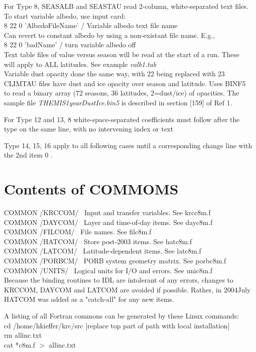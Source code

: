 \documentclass{article}
\newcommand{\qi}{\\ \hspace*{2.em}}      %
\newcommand{\nf}{\textit}  %
\begin{document}
For Type 8, SEASALB and SEASTAU read 2-column, white-separated text files. \\
To start variable albedo, use input card: 
\qi  8 22 0 'AlbedoFileName' / Variable albedo text file name \\
Can revert to constant albedo by using a non-existant file name. E.g.,
\qi  8 22 0 'badName' / turn variable albedo off \\
Text table files of value versus season will be read at the start of a
run. These will apply to ALL latitudes. See example  \nf{valb1.tab}   \\
Variable dust opacity done the same way, with 22 being replaced with 23 \\

CLIMTAU files have dust and ice opacity over season and latitude. Uses BINF5 to
read a binary array (72 seasons, 36 latitudes, 2=dust/ice) of opacities. The
sample file \nf{THEMIS1yearDustIce.bin5} is described in section [159] of Ref 1.

For Type 12 and 13, 8 white-space-separated coefficients must follow after 
the type on the same line, with no intervening index or text 

Type 14, 15, 16 apply to all following cases until a corresponding change line
with the 2nd item 0 .
 
\section{Contents of COMMOMS } %
 COMMON /KRCCOM/ \ Input and transfer variables. See krcc8m.f  
\\ COMMON /DAYCOM/ \ Layer and time-of-day items. See dayc8m.f  
\\ COMMON /FILCOM/ \ File names. See filc8m.f  
\\ COMMON /HATCOM/ \ Store post-2003 items. See hatc8m.f  
\\ COMMON /LATCOM/ \ Latitude-dependent items. See latc8m.f  
\\ COMMON /PORBCM/ \ PORB system geometry matrix.  See porbc8m.f  
\\ COMMON /UNITS/ \ Logical units for I/O and errors.  See unic8m.f  \\

Because the binding routines to IDL are intolerant of any errors, changes to
KRCCOM, DAYCOM and LATCOM are avoided if possible. Rather, in 2004July HATCOM
was added as a "catch-all" for any new items.

A listing of all Fortran commons can be generated by these Linux commands: \\ 
cd /home/hkieffer/krc/src [replace top part of path with local installation] \\ 
rm allinc.txt \\ 
cat  *c8m.f $>$ allinc.txt 
              
\end{document}

